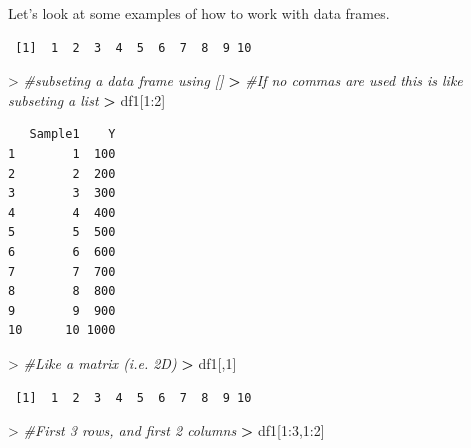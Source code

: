 \documentclass[
]{book}
\newenvironment{Shaded}{\begin{snugshade}}{\end{snugshade}}
\newcommand{\CommentTok}[1]{\textcolor[rgb]{0.56,0.35,0.01}{\textit{#1}}}
\newcommand{\DecValTok}[1]{\textcolor[rgb]{0.00,0.00,0.81}{#1}}
\newcommand{\ErrorTok}[1]{\textcolor[rgb]{0.64,0.00,0.00}{\textbf{#1}}}
\newcommand{\NormalTok}[1]{#1}
\newcommand{\SpecialCharTok}[1]{\textcolor[rgb]{0.00,0.00,0.00}{#1}}
\theoremstyle{definition}
\theoremstyle{definition}
\theoremstyle{definition}
\theoremstyle{definition}
\theoremstyle{remark}
\begin{document}
Let's look at some examples of how to work with data frames.

\begin{Shaded}
\end{Shaded}

\begin{verbatim}
 [1]  1  2  3  4  5  6  7  8  9 10
\end{verbatim}

\begin{Shaded}
\begin{Highlighting}[]
\SpecialCharTok{\textgreater{}} \CommentTok{\#subseting a data frame using []}
\ErrorTok{\textgreater{}} \CommentTok{\#If no commas are used this is like subseting a list }
\ErrorTok{\textgreater{}}\NormalTok{ df1[}\DecValTok{1}\SpecialCharTok{:}\DecValTok{2}\NormalTok{]}
\end{Highlighting}
\end{Shaded}

\begin{verbatim}
   Sample1    Y
1        1  100
2        2  200
3        3  300
4        4  400
5        5  500
6        6  600
7        7  700
8        8  800
9        9  900
10      10 1000
\end{verbatim}

\begin{Shaded}
\begin{Highlighting}[]
\SpecialCharTok{\textgreater{}} \CommentTok{\#Like a matrix (i.e. 2D)}
\ErrorTok{\textgreater{}}\NormalTok{ df1[,}\DecValTok{1}\NormalTok{]}
\end{Highlighting}
\end{Shaded}

\begin{verbatim}
 [1]  1  2  3  4  5  6  7  8  9 10
\end{verbatim}

\begin{Shaded}
\begin{Highlighting}[]
\SpecialCharTok{\textgreater{}} \CommentTok{\#First 3 rows, and first 2 columns}
\ErrorTok{\textgreater{}}\NormalTok{ df1[}\DecValTok{1}\SpecialCharTok{:}\DecValTok{3}\NormalTok{,}\DecValTok{1}\SpecialCharTok{:}\DecValTok{2}\NormalTok{]}
\end{Highlighting}
\end{Shaded}
\end{document}
